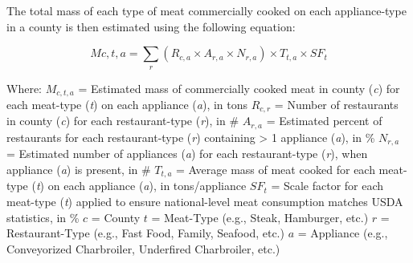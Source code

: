 \documentclass[
  11pt,
  oneside]{book}
\begin{document}
\begin{table}[H]
\centering
\caption{\label{tab:mass-appliance}Average mass of meat cooked per year on each cooking device (tons).}
\centering
{}
\end{table}

The total mass of each type of meat commercially cooked on each appliance-type in a county is then estimated using the following equation:

\begin{equation} 
  M{c,t,a} = \sum_{r}(R_{c,a} \times A_{r,a} \times N_{r,a}) \times T_{t,a} \times SF_{t}
  \label{eq:mass-meat}
\end{equation}

Where: \newline
\(M_{c,t,a}\) = Estimated mass of commercially cooked meat in county (\emph{c}) for each meat-type (\emph{t}) on each appliance (\emph{a}), in tons \newline
\(R_{c,r}\) = Number of restaurants in county (\emph{c}) for each restaurant-type (\emph{r}), in \# \newline
\(A_{r,a}\) = Estimated percent of restaurants for each restaurant-type (\emph{r}) containing \textgreater{} 1 appliance (\emph{a}), in \% \newline
\(N_{r,a}\) = Estimated number of appliances (\emph{a}) for each restaurant-type (\emph{r}), when appliance (\emph{a}) is present, in \# \newline
\(T_{t,a}\) = Average mass of meat cooked for each meat-type (\emph{t}) on each appliance (\emph{a}), in tons/appliance \newline
\(SF_{t}\) = Scale factor for each meat-type (\emph{t}) applied to ensure national-level meat consumption matches USDA statistics, in \% \newline
\(c\) = County \newline
\(t\) = Meat-Type (e.g., Steak, Hamburger, etc.) \newline
\(r\) = Restaurant-Type (e.g., Fast Food, Family, Seafood, etc.) \newline
\(a\) = Appliance (e.g., Conveyorized Charbroiler, Underfired Charbroiler, etc.) \newline
\end{document}
